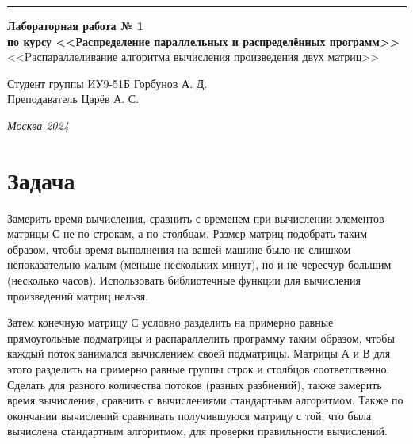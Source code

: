 \documentclass[a4paper, 14pt]{extarticle}
\begin{document}
\begin{titlepage}
\vspace*{-16pt}
\hspace{30pt}\rule{0.866\textwidth}{0.4pt}
  
\vspace{11em}

\begin{center}
\Large {\bf Лабораторная работа № 1} \\ 
\large {\bf по курсу <<Распределение параллельных и распределённых программ>>}\\
\large <<Pаспараллеливание алгоритма вычисления произведения двух матриц>>
\end{center}\normalsize

\vspace{8em}


\begin{flushright}
  {Студент группы ИУ9-51Б Горбунов А. Д.\hspace*{15pt} \\
  \vspace{2ex}
  Преподаватель Царёв А. С.\hspace*{15pt}}
\end{flushright}

\bigskip

\vfill
 

\begin{center}
\textsl{Москва 2024}
\end{center}
\end{titlepage}

\renewcommand{\ttdefault}{pcr}

\setlength{\tabcolsep}{3pt}
\newpage
\setcounter{page}{2}

\section{Задача}\label{Sect::task}
\par
    Замерить время вычисления, сравнить с временем при вычислении элементов матрицы С не по строкам, а по столбцам. Размер матриц подобрать таким образом, чтобы время выполнения на вашей машине было не слишком непоказательно малым (меньше нескольких минут), но и не чересчур большим (несколько часов). Использовать библиотечные функции для вычисления произведений матриц нельзя.

 
    Затем конечную матрицу С условно разделить на примерно равные прямоугольные подматрицы и распараллелить программу таким образом, чтобы каждый поток занимался вычислением своей подматрицы. Матрицы А и В для этого разделить на примерно равные группы строк и столбцов соответственно. Сделать для разного количества потоков (разных разбиений), также замерить время вычисления, сравнить с вычислениями стандартным алгоритмом. Также по окончании вычислений сравнивать получившуюся матрицу с той, что была вычислена стандартным алгоритмом, для проверки правильности вычислений.
\end{document}
